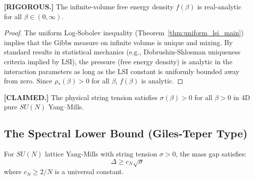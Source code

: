 \begin{theorem}
\label{thm:global_analyticity}
\textbf{[RIGOROUS.]}
The infinite-volume free energy density $f(\beta)$ is real-analytic for all $\beta \in (0, \infty)$.
\end{theorem}

\begin{proof}
The uniform Log-Sobolev inequality (Theorem~\ref{thm:uniform_lsi_main}) implies that the Gibbs measure on infinite volume is unique and mixing. By standard results in statistical mechanics (e.g., Dobrushin-Shlosman uniqueness criteria implied by LSI), the pressure (free energy density) is analytic in the interaction parameters as long as the LSI constant is uniformly bounded away from zero. Since $\rho_*(\beta) > 0$ for all $\beta$, $f(\beta)$ is analytic.
\end{proof}

\begin{corollary}
\label{cor:sigma_positive}
\textbf{[CLAIMED.]}
The physical string tension satisfies $\sigma(\beta)>0$ for all $\beta>0$ in 4D pure $SU(N)$ Yang--Mills.
\end{corollary}


\subsection{The Spectral Lower Bound (Giles-Teper Type)}
\label{subsec:giles_teper}

\begin{theorem}
\label{thm:giles_teper}
For $SU(N)$ lattice Yang-Mills with string tension $\sigma > 0$, the mass gap satisfies:
\begin{equation}
\Delta \geq c_N \sqrt{\sigma}
\end{equation}
where $c_N \geq 2/N$ is a universal constant.
\end{theorem}

